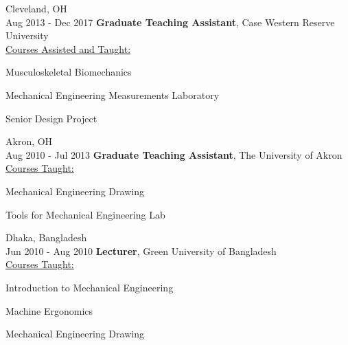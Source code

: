 \documentclass[11pt, letterpaper]{article}
\begin{document}
    \begin{twocolentry}{
        Cleveland, OH\\
        Aug 2013 - Dec 2017
    }
        \textbf{Graduate Teaching Assistant}, Case Western Reserve University\\
        \uline{Courses Assisted and Taught:} 
            \begin{highlightsforbulletentries}
                \item Musculoskeletal Biomechanics
                \item Mechanical Engineering Measurements Laboratory
                \item Senior Design Project
            \end{highlightsforbulletentries}
    \end{twocolentry}
    \vspace{5 pt}

    \begin{twocolentry}{
        Akron, OH\\
        Aug 2010 - Jul 2013
    }
        \textbf{Graduate Teaching Assistant}, The University of Akron\\
        \uline{Courses Taught:} 
            \begin{highlightsforbulletentries}
                \item Mechanical Engineering Drawing
                \item Tools for Mechanical Engineering Lab
            \end{highlightsforbulletentries}
    \end{twocolentry}
    \vspace{5 pt}

        \begin{twocolentry}{
        Dhaka, Bangladesh\\
        Jun 2010 - Aug 2010
    }
        \textbf{Lecturer}, Green University of Bangladesh\\
        \uline{Courses Taught:} 
            \begin{highlightsforbulletentries}
                \item Introduction to Mechanical Engineering
                \item Machine Ergonomics
                \item Mechanical Engineering Drawing
            \end{highlightsforbulletentries}
    \end{twocolentry}
    \vspace{5 pt}
\end{document}
